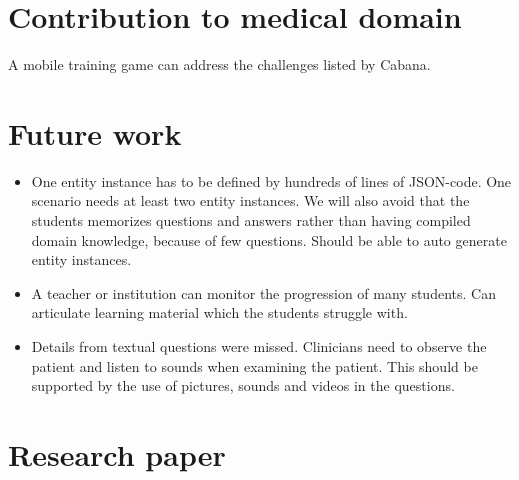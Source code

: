 \documentclass[20pt]{extarticle}
\begin{document}
\section{Contribution to medical domain}
A mobile training game can address the challenges listed by Cabana.

\section{Future work}
\begin{itemize}
	\item One entity instance has to be defined by hundreds of lines of JSON-code. One scenario needs at least two entity instances. We will also avoid that the students memorizes questions and answers rather than having compiled domain knowledge, because of few questions. Should be able to auto generate entity instances.
	\item A teacher or institution can monitor the progression of many students. Can articulate learning material which the students struggle with.
	\item Details from textual questions were missed. Clinicians need to observe the patient and listen to sounds when examining the patient. This should be supported by the use of pictures, sounds and videos in the questions.
\end{itemize}

	\section{Research paper}
\end{document}
